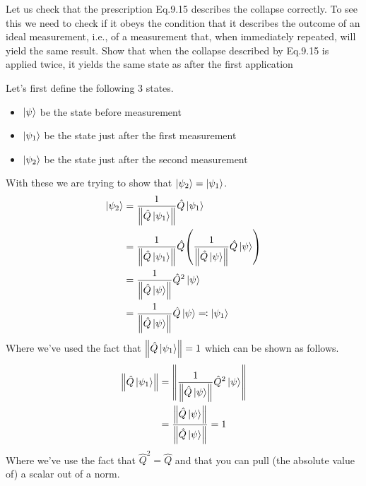 \documentclass[boxes,pages]{homework}
\makeatletter
\numberwithin{@problem}{section}
\makeatother
\begin{document}
\begin{problem}
Let us check that the prescription Eq.9.15 describes the collapse correctly. To see this we need to check if it obeys the condition that it describes the outcome of an ideal measurement, i.e., of a measurement that, when immediately repeated, will yield the same result. Show that when the collapse described by Eq.9.15 is applied twice, it yields the same state as after the first application
\end{problem}

\begin{solution}
	Let's first define the following 3 states.
	\begin{itemize}
		\item $\ket{\psi}$ be the state before measurement
		\item $\ket{\psi_1}$ be the state just after the first measurement
		\item $\ket{\psi_2}$ be the state just after the second measurement
	\end{itemize}
	With these we are trying to show that $\ket{\psi_2} = \ket{\psi_1}$.
	\begin{align*}
		\ket{\psi_2} & = \frac{1}{\norm{\hat{Q}\ket{\psi_1}}}\hat{Q}\ket{\psi_1}                                              \\
		             & = \frac{1}{\norm{\hat{Q}\ket{\psi_1}}}\hat{Q}\qty(\frac{1}{\norm{\hat{Q}\ket{\psi}}}\hat{Q}\ket{\psi}) \\
		             & = \frac{1}{\norm{\hat{Q}\ket{\psi}}}\hat{Q}^2\ket{\psi}                                                \\
		             & = \frac{1}{\norm{\hat{Q}\ket{\psi}}}\hat{Q}\ket{\psi} \eqqcolon \ket{\psi_1}
	\end{align*}
	Where we've used the fact that $\norm{\hat{Q}\ket{\psi_1}} = 1$ which can be shown as follows.
	\begin{align*}
		\norm{\hat{Q}\ket{\psi_1}} & = \norm{\frac{1}{\norm{\hat{Q}\ket{\psi}}}\hat{Q}^2\ket{\psi}}  \\
		                           & = \frac{\norm{\hat{Q}\ket{\psi}}}{\norm{\hat{Q}\ket{\psi}}} = 1
	\end{align*}
	Where we've use the fact that $\hat{Q}^2 = \hat{Q}$ and that you can pull (the absolute value of) a scalar out of a norm.
\end{solution}
\end{document}
